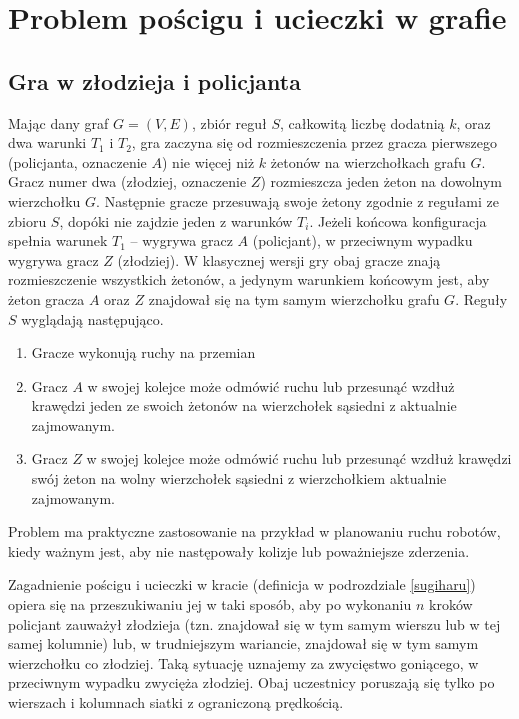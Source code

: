 \documentclass[brudnopis]{xmgr}
\theoremstyle{definition}
\begin{document}
\chapter{Problem pościgu i ucieczki w grafie}
\section{Gra w złodzieja i policjanta}\label{sec:poscig}
Mając dany graf $G=(V,E)$, zbiór reguł $S$, całkowitą liczbę dodatnią $k$, oraz dwa warunki $T_1$ i $T_2$, gra zaczyna się od rozmieszczenia przez gracza pierwszego (policjanta, oznaczenie $A$) nie więcej niż $k$ żetonów na wierzchołkach grafu $G$. Gracz numer dwa (złodziej, oznaczenie $Z$) rozmieszcza jeden żeton na dowolnym wierzchołku $G$. Następnie gracze przesuwają swoje żetony zgodnie z regułami ze zbioru $S$, dopóki nie zajdzie jeden z warunków $T_i$. Jeżeli końcowa konfiguracja spełnia warunek $T_1$ -- wygrywa gracz $A$ (policjant), w przeciwnym wypadku wygrywa gracz $Z$ (złodziej). W klasycznej wersji gry \cite{aigner} obaj gracze znają rozmieszczenie wszystkich żetonów, a jedynym warunkiem końcowym jest, aby żeton gracza $A$ oraz $Z$ znajdował się na tym samym wierzchołku grafu $G$.
Reguły $S$ wyglądają następująco.
\begin{enumerate}
  \item Gracze wykonują ruchy na przemian
  \item Gracz $A$ w swojej kolejce może odmówić ruchu lub przesunąć wzdłuż krawędzi jeden ze swoich żetonów na wierzchołek sąsiedni z aktualnie zajmowanym.
  \item Gracz $Z$ w swojej kolejce może odmówić ruchu lub przesunąć wzdłuż krawędzi swój żeton na wolny wierzchołek sąsiedni z wierzchołkiem aktualnie zajmowanym.
\end{enumerate}

Problem ma praktyczne zastosowanie na przykład w planowaniu ruchu robotów, kiedy ważnym jest, aby nie następowały kolizje lub poważniejsze zderzenia.

Zagadnienie pościgu i ucieczki w kracie (definicja w podrozdziale \ref{sugiharu}) opiera się na przeszukiwaniu jej w taki sposób, aby po wykonaniu $n$ kroków policjant zauważył złodzieja (tzn. znajdował się w tym samym wierszu lub w tej samej kolumnie) lub, w trudniejszym wariancie, znajdował się w tym samym wierzchołku co złodziej. Taką sytuację uznajemy za zwycięstwo goniącego, w przeciwnym wypadku zwycięża złodziej. Obaj uczestnicy poruszają się tylko po wierszach i kolumnach siatki z ograniczoną prędkością.
\end{document}
